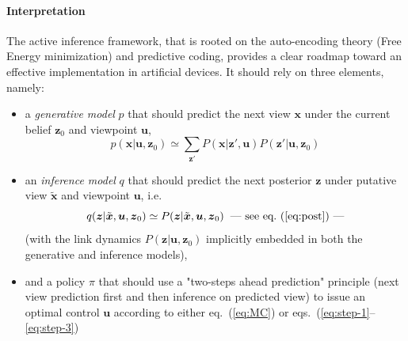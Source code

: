 \documentclass{article} %
\begin{document}

\paragraph{Interpretation}

The active inference framework, that is rooted on the auto-encoding theory (Free Energy minimization) and predictive coding, provides a clear roadmap toward an effective implementation in artificial devices. It should rely on three elements, namely:
\begin{itemize}
	\item a \emph{generative model} $p$ that should predict the next view $\boldsymbol{x}$ under the current belief $\boldsymbol{z}_0$ and viewpoint $\boldsymbol{u}$, 
$$p(\boldsymbol{x}|\boldsymbol{u}, \boldsymbol{z}_0) \simeq \sum_{\boldsymbol{z}'}P(\boldsymbol{x}|\boldsymbol{z}',\boldsymbol{u}) P(\boldsymbol{z}'|\boldsymbol{u},\boldsymbol{z}_0) $$
   \item an \emph{inference model} $q$ that should predict the next posterior $\boldsymbol{z}$ under putative view $\tilde{\boldsymbol{x}}$ and viewpoint $\boldsymbol{u}$, i.e.
$$q(\boldsymbol{z}|\tilde{\boldsymbol{x}}, \boldsymbol{u},\boldsymbol{z}_0) \simeq  P(\boldsymbol{z}|\tilde{\boldsymbol{x}}, \boldsymbol{u},\boldsymbol{z}_0) \text{\hspace{.2cm}---~see eq.~(\ref{eq:post})~---}$$  %
(with the link dynamics $P(\boldsymbol{z}|\boldsymbol{u},\boldsymbol{z}_0)$ implicitly embedded in both the generative and inference models),
\item and a policy $\pi$ that should use a "two-steps ahead prediction" principle (next view prediction first and then inference on predicted view) to issue an optimal control $\boldsymbol{u}$ according to either eq.~(\ref{eq:MC}) or eqs.~(\ref{eq:step-1}--\ref{eq:step-3})
\end{itemize}  
\end{document}
